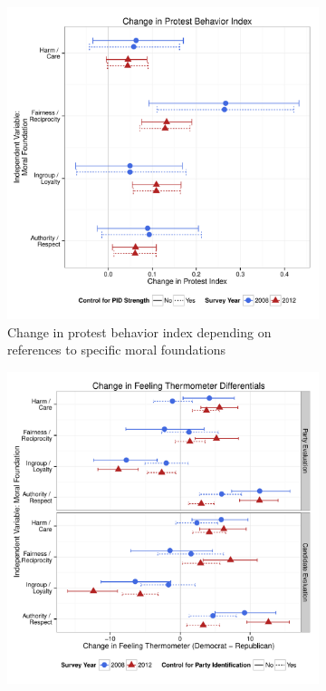 \documentclass[12pt]{article}
\begin{document}
\begin{figure}[ht]
\begin{subfigure}[t]{0.49\textwidth}
    \includegraphics[scale=.35]{../calc/fig/appD10part.pdf}
    \caption{Change in protest behavior index depending on references to specific moral foundations}\label{fig:appD10part}
  \end{subfigure}
  \begin{subfigure}[t]{0.49\textwidth}
    \includegraphics[scale=.35]{../calc/fig/appD11feel.pdf}

\end{subfigure}
\end{figure}
\end{document}
